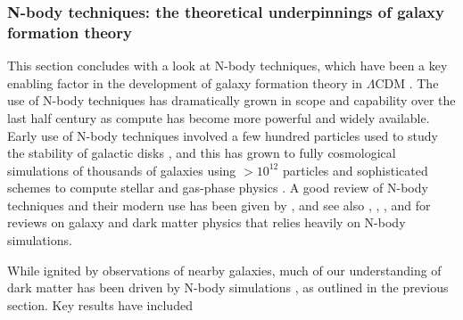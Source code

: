 \subsubsection{N-body techniques: the theoretical underpinnings of galaxy formation theory}

This section concludes with a look at N-body techniques, which have been a key enabling factor in the development of galaxy formation theory in $\Lambda$CDM \parencite{frenk12}. The use of N-body techniques has dramatically grown in scope and capability over the last half century as compute has become more powerful and widely available. Early use of N-body techniques involved a few hundred particles used to study the stability of galactic disks \parencite[e.g.][]{ostriker73}, and this has grown to fully cosmological simulations of thousands of galaxies using $> 10^{12}$ particles and sophisticated schemes to compute stellar and gas-phase physics \parencite[e.g.][]{eagle_model_crain15,tng_model_pillepich18}. A good review of N-body techniques and their modern use has been given by \textcite{crain23}, and see also \textcite{frenk12}, \textcite{somerville15}, \textcite{bullock17}, and \textcite{wechsler18} for reviews on galaxy and dark matter physics that relies heavily on N-body simulations.

While ignited by observations of nearby galaxies, much of our understanding of dark matter has been driven by N-body simulations \parencite{frenk12}, as outlined in the previous section. Key results have included 